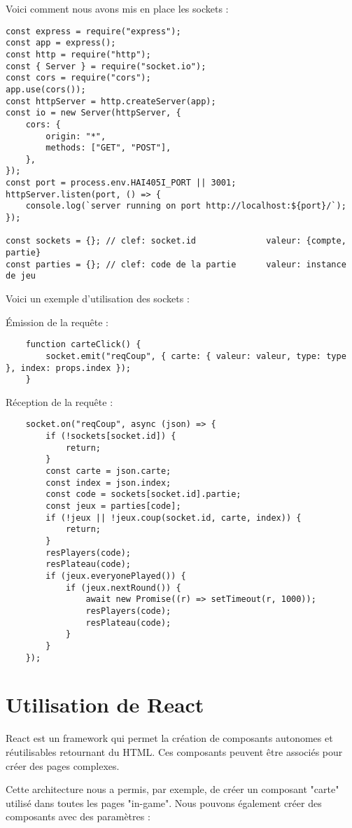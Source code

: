 \documentclass[a4paper]{article}
\begin{document}
Voici comment nous avons mis en place les sockets :
\begin{lstlisting}
const express = require("express");
const app = express();
const http = require("http");
const { Server } = require("socket.io");
const cors = require("cors");
app.use(cors());
const httpServer = http.createServer(app);
const io = new Server(httpServer, {
    cors: {
        origin: "*",
        methods: ["GET", "POST"],
    },
});
const port = process.env.HAI405I_PORT || 3001;
httpServer.listen(port, () => {
    console.log(`server running on port http://localhost:${port}/`);
});

const sockets = {}; // clef: socket.id              valeur: {compte, partie}
const parties = {}; // clef: code de la partie      valeur: instance de jeu
\end{lstlisting}

Voici un exemple d'utilisation des sockets :

Émission de la requête :
\begin{lstlisting}
    function carteClick() {
        socket.emit("reqCoup", { carte: { valeur: valeur, type: type }, index: props.index });
    }
\end{lstlisting}

Réception de la requête :
\begin{lstlisting}
    socket.on("reqCoup", async (json) => {
        if (!sockets[socket.id]) {
            return;
        }
        const carte = json.carte;
        const index = json.index;
        const code = sockets[socket.id].partie;
        const jeux = parties[code];
        if (!jeux || !jeux.coup(socket.id, carte, index)) {
            return;
        }
        resPlayers(code);
        resPlateau(code);
        if (jeux.everyonePlayed()) {
            if (jeux.nextRound()) {
                await new Promise((r) => setTimeout(r, 1000));
                resPlayers(code);
                resPlateau(code);
            }
        }
    });
\end{lstlisting}

\section{Utilisation de React}

React est un framework qui permet la création de composants autonomes et réutilisables retournant du HTML. Ces composants peuvent être associés pour créer des pages complexes.

Cette architecture nous a permis, par exemple, de créer un composant "carte" utilisé dans toutes les pages "in-game". Nous pouvons également créer des composants avec des paramètres :
\end{document}
